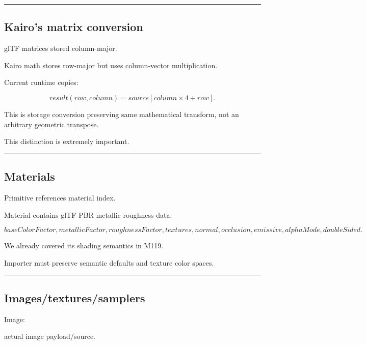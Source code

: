 \begin{center}\rule{0.5\linewidth}{0.5pt}\end{center}

\subsection{Kairo's matrix conversion}\label{04-visual-computing-ii-ch041-kairos-matrix-conversion}

glTF matrices stored column-major.

Kairo math stores row-major but uses column-vector multiplication.

Current runtime copies:

\[
result(row,column)
=
source[column\times4+row].
\]

This is storage conversion preserving same mathematical transform, not an arbitrary geometric transpose.

This distinction is extremely important.

\begin{center}\rule{0.5\linewidth}{0.5pt}\end{center}

\subsection{Materials}\label{04-visual-computing-ii-ch041-materials}

Primitive references material index.

Material contains glTF PBR metallic-roughness data:

\[
baseColorFactor,
metallicFactor,
roughnessFactor,
textures,
normal,
occlusion,
emissive,
alphaMode,
doubleSided.
\]

We already covered its shading semantics in M119.

Importer must preserve semantic defaults and texture color spaces.

\begin{center}\rule{0.5\linewidth}{0.5pt}\end{center}

\subsection{Images/textures/samplers}\label{04-visual-computing-ii-ch041-imagestexturessamplers}

Image:

actual image payload/source.


